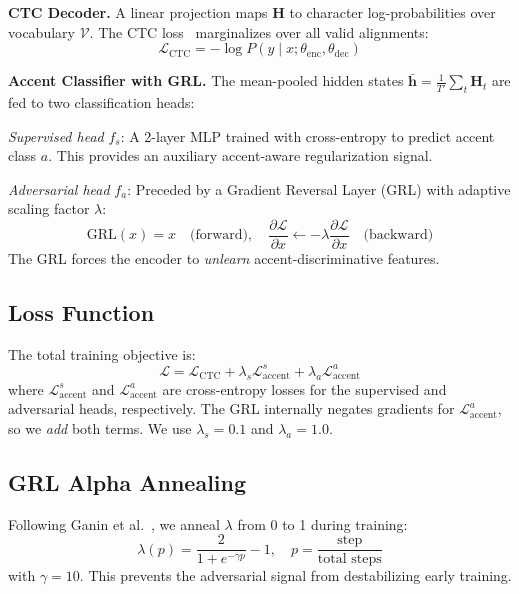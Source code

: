 \documentclass[10pt,twocolumn,letterpaper]{article}
\begin{document}
\textbf{CTC Decoder.} A linear projection maps $\mathbf{H}$ to character log-probabilities over vocabulary $\mathcal{V}$. The CTC loss~\cite{graves2006ctc} marginalizes over all valid alignments:
\begin{equation}
    \mathcal{L}_\text{CTC} = -\log P(y \mid x; \theta_\text{enc}, \theta_\text{dec})
\end{equation}

\textbf{Accent Classifier with GRL.} The mean-pooled hidden states $\bar{\mathbf{h}} = \frac{1}{T'}\sum_t \mathbf{H}_t$ are fed to two classification heads:

\textit{Supervised head} $f_s$: A 2-layer MLP trained with cross-entropy to predict accent class $a$. This provides an auxiliary accent-aware regularization signal.

\textit{Adversarial head} $f_a$: Preceded by a Gradient Reversal Layer (GRL) with adaptive scaling factor $\lambda$:
\begin{equation}
    \text{GRL}(x) = x \quad \text{(forward)}, \quad \frac{\partial \mathcal{L}}{\partial x} \leftarrow -\lambda \frac{\partial \mathcal{L}}{\partial x} \quad \text{(backward)}
\end{equation}
The GRL forces the encoder to \textit{unlearn} accent-discriminative features.

\subsection{Loss Function}

The total training objective is:
\begin{equation}
    \mathcal{L} = \mathcal{L}_\text{CTC} + \lambda_s \mathcal{L}_\text{accent}^s + \lambda_a \mathcal{L}_\text{accent}^a
\end{equation}
where $\mathcal{L}_\text{accent}^s$ and $\mathcal{L}_\text{accent}^a$ are cross-entropy losses for the supervised and adversarial heads, respectively. The GRL internally negates gradients for $\mathcal{L}_\text{accent}^a$, so we \textit{add} both terms. We use $\lambda_s = 0.1$ and $\lambda_a = 1.0$.

\subsection{GRL Alpha Annealing}

Following Ganin et al.~\cite{ganin2016domain}, we anneal $\lambda$ from 0 to 1 during training:
\begin{equation}
    \lambda(p) = \frac{2}{1 + e^{-\gamma p}} - 1, \quad p = \frac{\text{step}}{\text{total steps}}
\end{equation}
with $\gamma = 10$. This prevents the adversarial signal from destabilizing early training.
\end{document}

